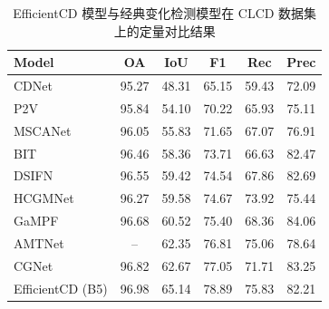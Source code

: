 \begin{table}[!htb]
  \centering
  \caption{EfficientCD 模型与经典变化检测模型在 CLCD 数据集上的定量对比结果}
  \label{tab:efficientcd_clcd}
  \begin{tabular}{lccccc}
    \toprule
    Model              &  OA   &  IoU  &  F1   &  Rec  & Prec  \\
    \midrule
    CDNet~\cite{Alcantarilla2016StreetviewCD}              & 95.27 & 48.31 & 65.15 & 59.43 & 72.09 \\
    P2V~\cite{lin_transition_2023}                & 95.84 & 54.10 & 70.22 & 65.93 & 75.11 \\
    MSCANet~\cite{m_liu_cnn-transformer_2022}            & 96.05 & 55.83 & 71.65 & 67.07 & 76.91 \\
    BIT~\cite{chen_remote_2022}                & 96.46 & 58.36 & 73.71 & 66.63 & 82.47 \\
    DSIFN~\cite{Zhang2020ADS}              & 96.55 & 59.42 & 74.54 & 67.86 & 82.69 \\
    HCGMNet~\cite{Han2023HCGMNetAH}            & 96.27 & 59.58 & 74.67 & 73.92 & 75.44 \\
    GaMPF~\cite{Zhao2024GaMPFAF}              & 96.68 & 60.52 & 75.40 & 68.36 & 84.06 \\
    AMTNet~\cite{Liu2023AnAM}             &  --   & 62.35 & 76.81 & 75.06 & 78.64 \\
    CGNet~\cite{han_change_2023}              & 96.82 & 62.67 & 77.05 & 71.71 & 83.25 \\
    EfficientCD (B5)   & 96.98 & 65.14 & 78.89 & 75.83 & 82.21 \\
    \bottomrule
  \end{tabular}
\end{table}


